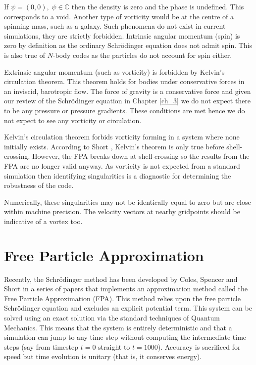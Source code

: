 If $\psi = (0,0), \;\psi\in\mathbb{C}$ then the density is zero and the phase is undefined. This corresponds to a void. Another type of vorticity would be at the centre of a spinning mass, such as a galaxy. Such phenomena do not exist in current simulations, they are strictly forbidden. Intrinsic angular momentum (spin) is zero by definition as the ordinary Schr\"odinger equation does not admit spin. This is also true of $N$-body codes as the particles do not account for spin either. 

Extrinsic angular momentum (such as vorticity) is forbidden by Kelvin's circulation theorem. This theorem holds for bodies under conservative forces in an inviscid, barotropic flow. The force of gravity is a conservative force and given our review of the Schr\"odinger equation in Chapter \ref{ch_3} we do not expect there to be any pressure or pressure gradients. These conditions are met hence we do not expect to see any vorticity or circulation.

Kelvin's circulation theorem forbids vorticity forming in a system where none initially exists. According to Short \citep{bib_short}, Kelvin's theorem is only true before shell-crossing. However, the FPA breaks down at shell-crossing so the results from the FPA are no longer valid anyway. As vorticity is not expected from a standard simulation then identifying singularities is a diagnostic for determining the robustness of the code.

Numerically, these singularities may not be identically equal to zero but are close within machine precision. The velocity vectors at nearby gridpoints should be indicative of a vortex too.


%
\chapter{Free Particle Approximation}
\label{ch_4}
Recently, the Schr\"odinger method has been developed by Coles, Spencer and Short \citep{bib_col, bib_spe, bib_sho, bib_sho2} in a series of papers that implements an approximation method called the Free Particle Approximation (FPA). This method relies upon the free particle Schr\"odinger equation and excludes an explicit potential term. This system can be solved using an exact solution via the standard techniques of Quantum Mechanics. This means that the system is entirely deterministic and that a simulation can jump to any time step without computing the intermediate time steps (say from timestep $t=0$ straight to $t=1000$). Accuracy is sacrificed for speed but time evolution is unitary (that is, it conserves energy).

